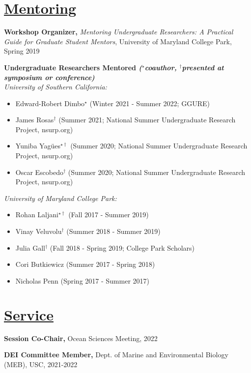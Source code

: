 \documentclass[]{res}
\begin{document}
\begin{resume}
\section{\underline{Mentoring}} \vspace{2mm}


{\bf Workshop Organizer,} \emph{Mentoring Undergraduate Researchers: A Practical Guide for Graduate Student Mentors}, University of Maryland College Park, Spring 2019

{\bf Undergraduate Researchers Mentored \emph{\footnotesize{($^{\star}$coauthor, $^{\dagger}$presented at symposium or conference)}}} \\
\emph{University of Southern California:}
\begin{itemize}[leftmargin=*]
\item[] Edward-Robert Dimbo$^{\star}$ (Winter 2021 - Summer 2022; GGURE)
\item[] James Rosas$^{\dagger}$ (Summer 2021; National Summer Undergraduate Research Project, nsurp.org)
\item[] Yuniba Yag{\"u}es$^{\star\dagger}$ (Summer 2020; National Summer Undergraduate Research Project, nsurp.org)
\item[] Oscar Escobedo$^{\dagger}$ (Summer 2020; National Summer Undergraduate Research Project, nsurp.org)
\end{itemize}
\vspace{1mm}
\emph{University of Maryland College Park:}
\begin{itemize}[leftmargin=*]
\item[] Rohan Laljani$^{\star\dagger}$ (Fall 2017 - Summer 2019)
\item[] Vinay Veluvolu$^{\dagger}$ (Summer 2018 - Summer 2019)
\item[] Julia Gall$^{\dagger}$ (Fall 2018 - Spring 2019; College Park Scholars)
\item[] Cori Butkiewicz (Summer 2017 - Spring 2018)
\item[] Nicholas Penn (Spring 2017 - Summer 2017)
\end{itemize}


\section{\underline{Service}} \vspace{2mm}

{\bf Session Co-Chair,} {Ocean Sciences Meeting}, 2022

{\bf DEI Committee Member,} {Dept. of Marine and Environmental Biology (MEB)}, USC, 2021-2022


\end{resume}
\end{document}
